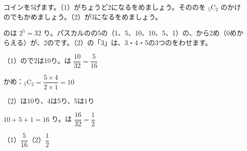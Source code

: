 \begin{reidai}
コインを5げます。（1）がちょうど2になるをめましょう。そののを ${}_5\mathrm{C}_2$ のかけのでもかめましょう。（2）が3になるをめましょう。\par
\kangaekata {}のは $2^5=32$ り。パスカルのの5の（1、5、10、10、5、1）の、から2め（0めからえる）が、2のです。（2）の「3」は、3・4・5の3つのをわせます。\par
\shiki（1）ので2は10り。は $\dfrac{10}{32}=\dfrac{5}{16}$\par
\hspace*{2.6\zw}かめ：${}_5\mathrm{C}_2=\dfrac{5\times4}{2\times1}=10$\par
\hspace*{2.6\zw}（2）は10り、4は5り、5は1り\par
\hspace*{2.6\zw}$10+5+1=16$ り。は $\dfrac{16}{32}=\dfrac{1}{2}$\par
\kotae（1）\nobreak $\dfrac{5}{16}$\quad（2）\nobreak $\dfrac{1}{2}$
\end{reidai}

